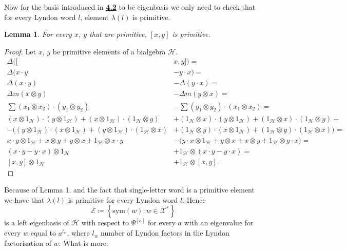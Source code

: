 \documentclass[a4paper, 12pt]{article}
\newtheorem{lemma}{Lemma}
\begin{document}
Now for the basis introduced in \hyperref[basis]{\textbf{4.2}} to be eigenbasis we only need to check that for
every Lyndon
word $l$, element $\lambda(l)$ is primitive.

\begin{lemma}
For every $x$, $y$ that are primitive, $[x, y]$ is primitive.
\end{lemma}

\begin{proof}
Let $x$, $y$ be primitive elements of a bialgebra $\mathcal{H}$.
\begin{align*}
\Delta([&x, y]) = \\ \Delta(x\cdot y &- y\cdot x) =\\ \Delta (x\cdot y) &- \Delta(y\cdot x) =\\
\Delta m(x \otimes y) &- \Delta m(y \otimes x) =\\
\sum (x_1 \otimes x_2) \cdot (y_1 \otimes y_2) &- \sum (y_1 \otimes y_2) \cdot (x_1 \otimes x_2) = \\
(x \otimes 1_\mathcal{H}) \cdot (y \otimes 1_\mathcal{H}) + (x \otimes 1_\mathcal{H}) \cdot (1_\mathcal{H}
\otimes y)
&+ (1_\mathcal{H} \otimes x) \cdot (y \otimes 1_\mathcal{H}) + (1_\mathcal{H} \otimes x) \cdot
(1_\mathcal{H} \otimes y) + \\
- \Big((y \otimes 1_\mathcal{H}) \cdot (x \otimes 1_\mathcal{H}) + (y \otimes 1_\mathcal{H}) \cdot
(1_\mathcal{H} \otimes x)
&+ (1_\mathcal{H} \otimes y) \cdot (x \otimes 1_\mathcal{H}) + (1_\mathcal{H} \otimes y) \cdot
(1_\mathcal{H} \otimes x) \Big) = \\
x \cdot y \otimes 1_\mathcal{H} + x \otimes y + y \otimes x + 1_\mathcal{H} \otimes x \cdot y
&- \Big( y \cdot x \otimes 1_\mathcal{H} + y \otimes x + x \otimes y + 1_\mathcal{H} \otimes y \cdot x
\Big) = \\
(x \cdot y - y \cdot x) \otimes 1_\mathcal{H} &+ 1_\mathcal{H} \otimes (x \cdot y - y \cdot x) = \\
[x, y] \otimes 1_\mathcal{H} &+ 1_\mathcal{H} \otimes [x, y].
\end{align*}

\end{proof}

Because of Lemma 1. and the fact that single-letter word is a primitive element we have that $\lambda(l)$ is
primitive
for every Lyndon word $l$. Hence
\begin{equation*}
\mathcal{E} \coloneqq\left\{\mathrm{sym}(w) : w \in \mathcal{X}^*\right\}
\end{equation*}
is a left eigenbasis of $\mathcal{H}$ with respect to $\Psi^{[a]}$ for every $a$ with an eigenvalue for every
$w$ equal to $a^{l_w}$, where $l_w$ number of Lyndon factors in the Lyndon factorisation of $w$.
What is more:
\end{document}
